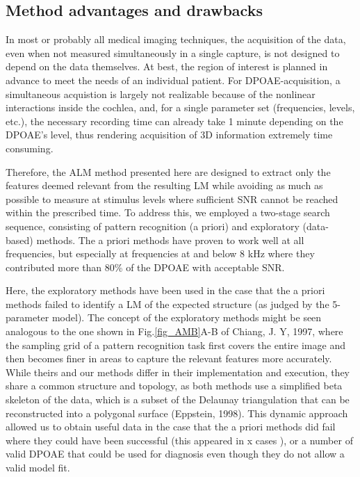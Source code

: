 \documentclass[journal,twoside,web]{ieeecolor2}
\begin{document}
\subsection{Method advantages and drawbacks}
In most or probably all medical imaging techniques, the acquisition of the data, even when not measured simultaneously in a single capture, is not designed to depend on the data themselves. At best, the region of interest is planned in advance to meet the needs of an individual patient. For DPOAE-acquisition, a simultaneous acquistion is largely not realizable because of the nonlinear interactions inside the cochlea, and, for a single parameter set (frequencies, levels, etc.), the necessary recording time can already take 1 minute depending on the DPOAE's level, thus rendering acquisition of 3D information extremely time consuming.

Therefore, the ALM method presented here are designed to extract only the features deemed relevant from the resulting LM while avoiding as much as possible to measure at stimulus levels where sufficient SNR cannot be reached within the prescribed time. To address this, we employed a two-stage search sequence, consisting of pattern recognition (a priori) and exploratory (data-based) methods. The a priori methods have proven to work well at all frequencies, but especially at frequencies at and below 8 kHz where they contributed more than 80\% of the DPOAE with acceptable SNR.

Here, the exploratory methods have been used in the case that the a priori methods failed to identify a LM of the expected structure (as judged by the 5-parameter model).  The concept of the exploratory methods might be seen analogous to the one shown in Fig.\ref{fig_AMB}A-B of  Chiang, J. Y, 1997, where the sampling grid of a pattern recognition task first covers the entire image and then becomes finer in areas to capture the relevant features more accurately.
While theirs and our methods differ in their implementation and execution, they share a common structure and topology, as both methods use a simplified beta skeleton of the data, which is a subset of the Delaunay triangulation that can be reconstructed into a polygonal surface (Eppstein, 1998).
This dynamic approach allowed us to obtain useful data in the case that the a priori methods did fail where they could have been successful (this appeared in x cases ), or a number of valid DPOAE that could be used for diagnosis even though they do not allow a valid model fit.
\end{document}
